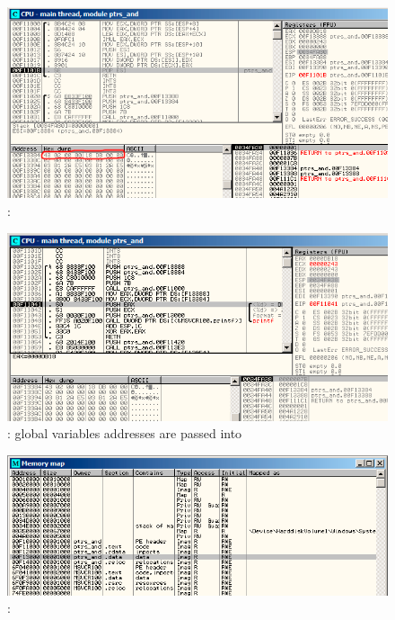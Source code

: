 \begin{figure}[H]
\centering
\includegraphics[scale=0.66]{patterns/061_pointers/olly_global3.png}
\caption{\olly: \ttf {}}
\label{fig:pointers_olly_global_3}
\end{figure}

\begin{figure}[H]
\centering
\includegraphics[scale=0.66]{patterns/061_pointers/olly_global4.png}
\caption{\olly: 
{global variables addresses are passed into} \printf}
\label{fig:pointers_olly_global_4}
\end{figure}

\begin{figure}[H]
\centering
\includegraphics[scale=0.66]{patterns/061_pointers/olly_global5.png}
\caption{\olly: }
\label{fig:pointers_olly_global_5}
\end{figure}

